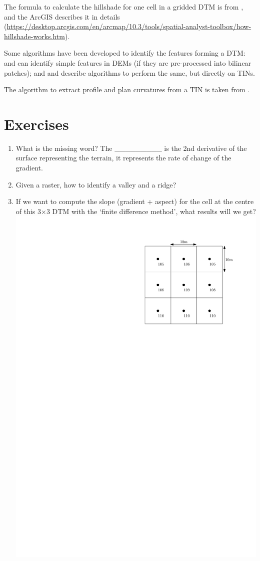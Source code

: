 The formula to calculate the hillshade for one cell in a gridded DTM is from \citet{Burrough98}, and the ArcGIS describes it in details (\url{https://desktop.arcgis.com/en/arcmap/10.3/tools/spatial-analyst-toolbox/how-hillshade-works.htm}).

Some algorithms have been developed to identify the features forming a DTM: \citet{Kweon94} and \citet{Schneider05} can identify simple features in DEMs (if they are pre-processed into bilinear patches); and \citet{Magillo09} and \citet{Edelsbrunner01-1} describe algorithms to perform the same, but directly on TINs.

The algorithm to extract profile and plan curvatures from a TIN is taken from \citet{vanKreveld97}.




%
\section{Exercises}

\begin{enumerate}
  \item What is the missing word? The \_\_\_\_\_\_\_\_\_ is the 2nd derivative of the surface representing the terrain, it represents the rate of change of the gradient.
  \item Given a raster, how to identify a valley and a ridge?
  \item If we want to compute the slope (gradient + aspect) for the cell at the centre of this 3$\times$3 DTM with the `finite difference method', what results will we get?
  \\
  \includegraphics[width=0.4\linewidth]{figs/slope_grid_question}
\end{enumerate}
